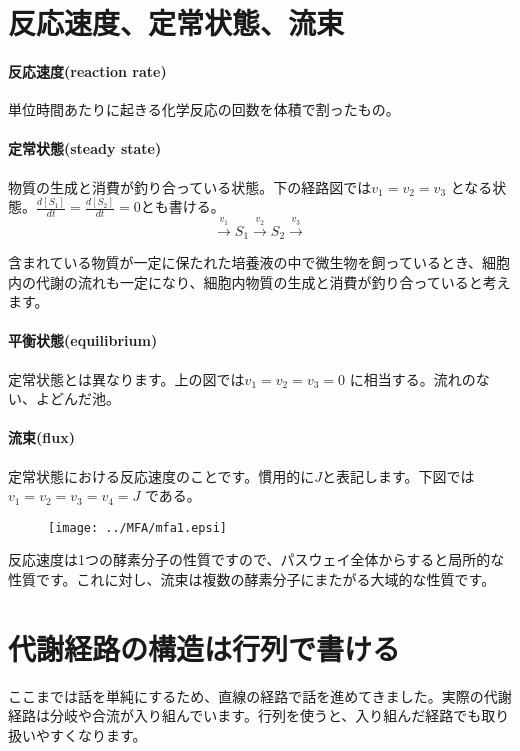 \section{反応速度、定常状態、流束}


\paragraph{反応速度(reaction rate)}
単位時間あたりに起きる化学反応の回数を体積で割ったもの。

\paragraph{定常状態(steady state)}物質の生成と消費が釣り合っている状態。下の経路図では$v_1 = v_2 = v_3$ となる状態。\(\displaystyle \frac{d[S_1]}{dt}=\frac{d[S_2]}{dt}=0\)とも書ける。
\[\overset{v_1}\rightarrow S_1 \overset{v_2}\rightarrow S_2 \overset{v_3}\rightarrow \]

含まれている物質が一定に保たれた培養液の中で微生物を飼っているとき、細胞内の代謝の流れも一定になり、細胞内物質の生成と消費が釣り合っていると考えます。


\paragraph{平衡状態(equilibrium)}
定常状態とは異なります。上の図では$v_1 = v_2 = v_3 = 0$ に相当する。流れのない、よどんだ池。

\paragraph{流束(flux)}
定常状態における反応速度のことです。慣用的に\(J\)と表記します。下図では\(v_1 = v_2 = v_3 = v_4 = J\) である。
\begin{figure}[h]
\begin{center}
\texttt{[image: ../MFA/mfa1.epsi]}
\end{center}
\end{figure}
反応速度は1つの酵素分子の性質ですので、パスウェイ全体からすると局所的な性質です。これに対し、流束は複数の酵素分子にまたがる大域的な性質です。\\


\section{代謝経路の構造は行列で書ける}
ここまでは話を単純にするため、直線の経路で話を進めてきました。実際の代謝経路は分岐や合流が入り組んでいます。行列を使うと、入り組んだ経路でも取り扱いやすくなります。

